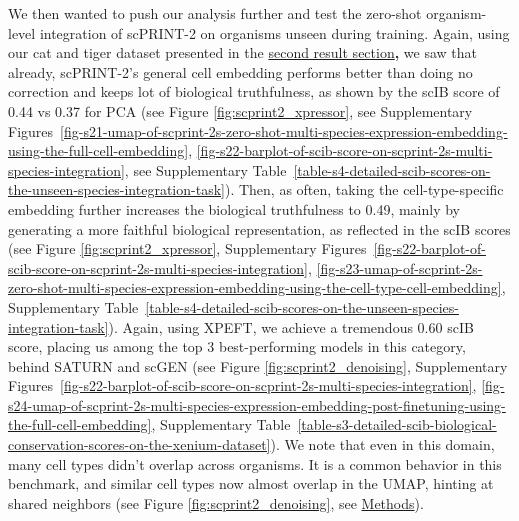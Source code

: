 We then wanted to push our analysis further and test the zero-shot
organism-level integration of \gls{scPRINT}-2 on organisms unseen during
training. Again, using our cat and tiger dataset presented in the
\hyperref[a-diverse-dataset-of-350-million-cells-pushes-generalization-to-unseen-organisms]{second
result section}\textbf{,} we saw that already, \gls{scPRINT}-2's general cell
embedding performs better than doing no correction and keeps lot of
biological truthfulness, as shown by the \gls{scIB} score of 0.44 vs 0.37 for
PCA (see Figure \ref{fig:scprint2_xpressor}, see Supplementary Figures~\ref{fig-s21-umap-of-scprint-2s-zero-shot-multi-species-expression-embedding-using-the-full-cell-embedding}, \ref{fig-s22-barplot-of-scib-score-on-scprint-2s-multi-species-integration}, see Supplementary Table~\ref{table-s4-detailed-scib-scores-on-the-unseen-species-integration-task}).
Then, as often, taking the cell-type-specific embedding further
increases the biological truthfulness to 0.49, mainly by generating a
more faithful biological representation, as reflected in the \gls{scIB} scores
(see Figure \ref{fig:scprint2_xpressor}, Supplementary Figures~\ref{fig-s22-barplot-of-scib-score-on-scprint-2s-multi-species-integration}, \ref{fig-s23-umap-of-scprint-2s-zero-shot-multi-species-expression-embedding-using-the-cell-type-cell-embedding}, Supplementary Table~\ref{table-s4-detailed-scib-scores-on-the-unseen-species-integration-task}). Again, using
XPEFT, we achieve a tremendous 0.60 \gls{scIB} score, placing us among the top
3 best-performing models in this category, behind SATURN and scGEN (see
Figure \ref{fig:scprint2_denoising}, Supplementary Figures~\ref{fig-s22-barplot-of-scib-score-on-scprint-2s-multi-species-integration}, \ref{fig-s24-umap-of-scprint-2s-multi-species-expression-embedding-post-finetuning-using-the-full-cell-embedding}, Supplementary Table~\ref{table-s3-detailed-scib-biological-conservation-scores-on-the-xenium-dataset}). We note that even in
this domain, many cell types didn't overlap across organisms. It is a
common behavior in this benchmark, and similar cell types now almost
overlap in the \gls{UMAP}, hinting at shared neighbors (see Figure \ref{fig:scprint2_denoising}, see
\hyperref[embedding-task]{Methods})\citep{mcinnesUMAPUniformManifold2020}.

